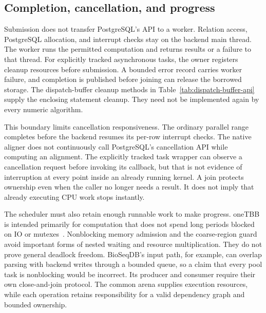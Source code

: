 \subsection{Completion, cancellation, and progress}
\label{sec:arch-scheduler-completion}

Submission does not transfer PostgreSQL's API to a worker. Relation access,
PostgreSQL allocation, and interrupt checks stay on the backend main thread.
The worker runs the permitted computation and returns results or a failure
to that thread. For explicitly tracked asynchronous tasks, the owner registers
cleanup resources before submission. A bounded error record carries worker
failure, and completion is published before joining can release the borrowed
storage. The dispatch-buffer cleanup methods in
Table~\ref{tab:dispatch-buffer-api} supply the enclosing
statement cleanup. They need not be implemented again by every numeric
algorithm.

This boundary limits cancellation responsiveness. The ordinary parallel
range completes before the backend resumes its per-row interrupt checks.
The native aligner does not continuously call PostgreSQL's cancellation
API while computing an alignment. The explicitly tracked task wrapper can
observe a cancellation request before invoking its callback, but that is
not evidence of interruption at every point inside an already running
kernel. A join protects ownership even when the caller no longer needs a
result. It does not imply that already executing CPU work stops instantly.

The scheduler must also retain enough runnable work to make progress.
oneTBB is intended primarily for computation that does not spend long
periods blocked on IO or mutexes~\autocite{onetbbBlocking}. Nonblocking memory
admission and the coarse-region guard avoid important forms of nested
waiting and resource multiplication. They do not prove general deadlock
freedom. BioSeqDB's input path, for example, can overlap parsing with
backend writes through a bounded queue, so a claim that every pool task is
nonblocking would be incorrect. Its producer and consumer require their
own close-and-join protocol. The common arena supplies execution resources,
while each operation retains responsibility for a valid dependency graph
and bounded ownership.
